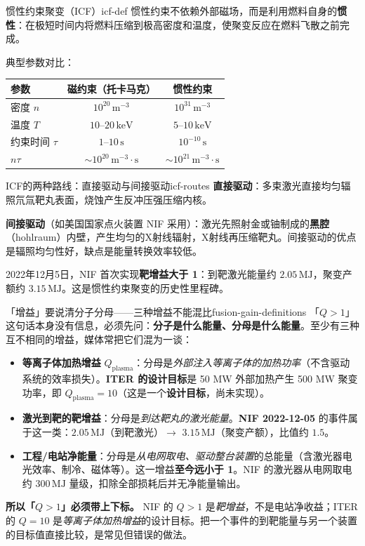 \documentclass[12pt,a4paper,openany,oneside]{book}
\begin{document}
\begin{definition}{惯性约束聚变（ICF）}{icf-def}
惯性约束不依赖外部磁场，而是利用燃料自身的\textbf{惯性}：在极短时间内将燃料压缩到极高密度和温度，使聚变反应在燃料飞散之前完成。

典型参数对比：
\begin{center}
\begin{tabular}{lcc}
\toprule
\textbf{参数} & \textbf{磁约束（托卡马克）} & \textbf{惯性约束} \\
\midrule
密度 $n$ & $10^{20}\,\mathrm{m}^{-3}$ & $10^{31}\,\mathrm{m}^{-3}$ \\
温度 $T$ & $10$--$20\,\mathrm{keV}$ & $5$--$10\,\mathrm{keV}$ \\
约束时间 $\tau$ & $1$--$10\,\mathrm{s}$ & $10^{-10}\,\mathrm{s}$ \\
$n\tau$ & $\sim 10^{20}\,\mathrm{m}^{-3}\cdot\mathrm{s}$ & $\sim 10^{21}\,\mathrm{m}^{-3}\cdot\mathrm{s}$ \\
\bottomrule
\end{tabular}
\end{center}
\end{definition}

\begin{insight}{ICF的两种路线：直接驱动与间接驱动}{icf-routes}
\textbf{直接驱动}：多束激光直接均匀辐照氘氚靶丸表面，烧蚀产生反冲压强压缩内核。

\textbf{间接驱动}（如美国国家点火装置 NIF 采用）：激光先照射金或铀制成的\textbf{黑腔}（hohlraum）内壁，产生均匀的X射线辐射，X射线再压缩靶丸。间接驱动的优点是辐照均匀性好，缺点是能量转换效率较低。

2022年12月5日，NIF 首次实现\textbf{靶增益大于 1}：到靶激光能量约 $2.05\,\mathrm{MJ}$，聚变产额约 $3.15\,\mathrm{MJ}$。这是惯性约束聚变的历史性里程碑。
\end{insight}

\begin{warning}{「增益」要说清分子分母——三种增益不能混比}{fusion-gain-definitions}
「$Q>1$」这句话本身没有信息，必须先问：\textbf{分子是什么能量、分母是什么能量}。至少有三种互不相同的增益，媒体常把它们混为一谈：
\begin{itemize}
\item \textbf{等离子体加热增益} $Q_{\text{plasma}}$：分母是\emph{外部注入等离子体的加热功率}（不含驱动系统的效率损失）。\textbf{ITER 的设计目标}是 50 MW 外部加热产生 500 MW 聚变功率，即 $Q_{\text{plasma}}=10$（这是一个\textbf{设计目标}，尚未实现）。
\item \textbf{激光到靶的靶增益}：分母是\emph{到达靶丸的激光能量}。\textbf{NIF 2022-12-05} 的事件属于这一类：$2.05\,\mathrm{MJ}$（到靶激光）$\to$ $3.15\,\mathrm{MJ}$（聚变产额），比值约 $1.5$。
\item \textbf{工程/电站净能量}：分母是\emph{从电网取电、驱动整台装置}的总能量（含激光器电光效率、制冷、磁体等）。这一增益\textbf{至今远小于 1}。NIF 的激光器从电网取电约 $300\,\mathrm{MJ}$ 量级，扣除全部损耗后并无净能量输出。
\end{itemize}
\textbf{所以「$Q>1$」必须带上下标。} NIF 的 $Q>1$ 是\emph{靶增益}，不是电站净收益；ITER 的 $Q=10$ 是\emph{等离子体加热增益}的设计目标。把一个事件的到靶能量与另一个装置的目标值直接比较，是常见但错误的做法。
\end{warning}
\end{document}
